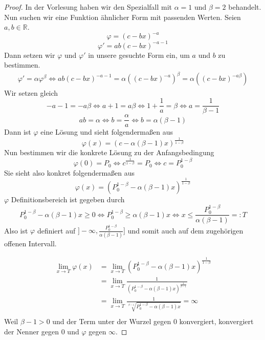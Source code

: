 \documentclass[10pt,a4paper]{article}
\begin{document}
\begin{proof}
In der Vorlesung haben wir den Spezialfall mit $\alpha = 1$ und $\beta = 2$ behandelt.
Nun suchen wir eine Funktion ähnlicher Form mit passenden Werten.
Seien $a, b \in \mathbb{R}$.
\begin{equation}
\varphi = (c - bx)^{-a}
\end{equation}
\begin{equation}
\varphi' = ab(c - bx)^{-a - 1}
\end{equation}
Dann setzen wir $\varphi$ und $\varphi'$ in unsere gesuchte Form ein, um $a$ und $b$ zu bestimmen.
\begin{align*}
\varphi' = \alpha \varphi^{\beta} \Leftrightarrow ab(c - bx)^{-a - 1} = \alpha ((c - bx)^{-a})^{\beta} = \alpha ((c - bx)^{-a\beta})
\end{align*}
Wir setzen gleich
\begin{equation}
- a - 1 = -a\beta \Leftrightarrow a + 1 = a\beta \Leftrightarrow 1 + \frac{1}{a} = \beta \Leftrightarrow a = \frac{1}{\beta - 1}
\end{equation}
\begin{equation}
ab = \alpha \Leftrightarrow b = \frac{\alpha}{a} \Leftrightarrow b = \alpha(\beta - 1)
\end{equation}
Dann ist $\varphi$ eine Lösung und sieht folgendermaßen aus
\begin{equation}
\varphi(x) = (c - \alpha(\beta - 1)x)^{\frac{1}{1 - \beta}}
\end{equation}
Nun bestimmen wir die konkrete Lösung zu der Anfangsbedingung
\begin{equation}
\varphi(0) = P_{0} \Leftrightarrow c^{\frac{1}{1 - \beta}} = P_{0} \Leftrightarrow c = P_{0}^{1 - \beta}
\end{equation}
Sie sieht also konkret folgendermaßen aus
\begin{equation}
\varphi(x) = (P_{0}^{1 - \beta} - \alpha(\beta - 1)x)^{\frac{1}{1 - \beta}}
\end{equation}
$\varphi$ Definitionsbereich ist gegeben durch
\begin{equation}
P_{0}^{1 - \beta} - \alpha(\beta - 1)x \ge 0 \Leftrightarrow P_{0}^{1 - \beta} \ge \alpha(\beta - 1)x \Leftrightarrow x \le \frac{P_{0}^{1 - \beta}}{\alpha(\beta - 1)} =: T
\end{equation}
Also ist $\varphi$ definiert auf $]-\infty, \frac{P_{0}^{1 - \beta}}{\alpha(\beta - 1)}]$ und somit auch auf dem zugehörigen offenen Intervall.

\begin{align*}
\lim_{x \rightarrow T} \varphi(x) & = \lim_{x \rightarrow T} (P_{0}^{1 - \beta} - \alpha(\beta - 1)x)^{\frac{1}{1 - \beta}}\\
& = \lim_{x \rightarrow T} \frac{1}{(P_{0}^{1 - \beta} - \alpha(\beta - 1)x)^{\frac{1}{\beta - 1}}}\\
& = \lim_{x \rightarrow T} \frac{1}{\sqrt[\beta - 1]{P_{0}^{1 - \beta} - \alpha(\beta - 1)x}} = \infty\\
\end{align*}
Weil $\beta - 1 > 0$ und der Term unter der Wurzel gegen $0$ konvergiert, konvergiert der Nenner gegen $0$ und $\varphi$ gegen $\infty$.
\end{proof}
\end{document}
